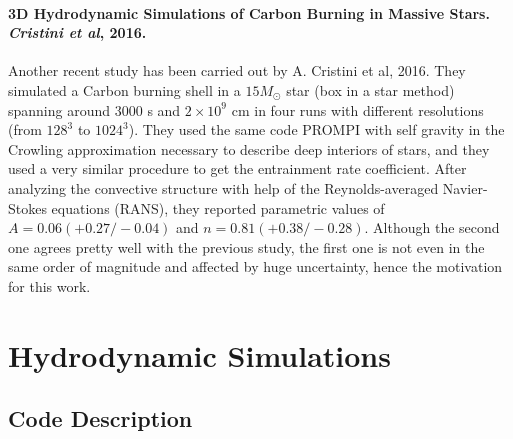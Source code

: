 \documentclass[11pt]{article}
\begin{document}
\paragraph{3D Hydrodynamic Simulations of Carbon Burning in Massive Stars. \textit{Cristini et al}, 2016.} 
Another recent study has been carried out by A. Cristini et al, 2016. They simulated a Carbon burning shell in a $15 M_{\odot}$ star (box in a star method) spanning around $3000$ s and $2 \times 10^9$ cm in four runs with different resolutions (from $128^3$ to $1024^3$). They used the same code PROMPI with self gravity in the Crowling approximation necessary to describe deep interiors of stars, and they used a very similar procedure to get the entrainment rate coefficient. After analyzing the convective structure with help of the Reynolds-averaged Navier-Stokes equations (RANS), they reported parametric values of $A= 0.06 (+0.27 / -0.04)$ and $n= 0.81 (+0.38 / -0.28)$. Although the second one agrees pretty well with the previous study, the first one is not even in the same order of magnitude and affected by huge uncertainty, hence the motivation for this work.


\section{Hydrodynamic Simulations}
\subsection{Code Description}
\end{document}
